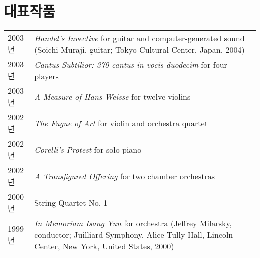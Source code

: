 \documentclass[dvipdfmx,a4paper]{article}
\begin{document}
  
  
  
  
  \vspace{2.5mm}
  
  \section*{\normalsize 대표작품}
  
  \hspace*{-0.25cm}
  \begin{tabular}{p{1.5cm} p{12.5cm}}
    2003년 & \textit{Handel’s Invective} for guitar and computer-generated sound (Soichi Muraji, guitar; Tokyo Cultural Center, Japan, 2004)\\[0.5mm]
    
    2003년 & \textit{Cantus Subtilior: 370 cantus in vocis duodecim} for four
    players\\[0.5mm]
    
    2003년 & \textit{A Measure of Hans Weisse} for twelve violins\\[0.5mm]
    
    2002년 & \textit{The Fugue of Art} for violin and orchestra quartet\\[0.5mm]
    
    2002년 & \textit{Corelli’s Protest} for solo piano\\[0.5mm]
    
    2002년 & \textit{A Transfigured Offering} for two chamber orchestras\\[0.5mm]
    
    2000년 & String Quartet No. 1\\[0.5mm]
    
    1999년 & \textit{In Memoriam Isang Yun} for orchestra (Jeffrey Milarsky, conductor; Juilliard Symphony, Alice Tully Hall, Lincoln Center, New York, United States, 2000)
  \end{tabular}
  
\end{document}
